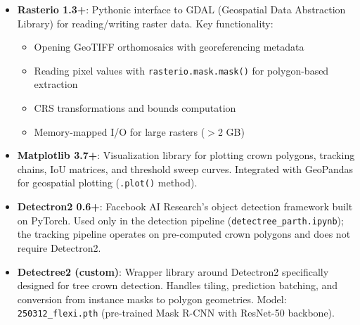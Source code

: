 \begin{itemize}[leftmargin=*, itemsep=2pt]
    \item \textbf{Rasterio 1.3+}: Pythonic interface to GDAL (Geospatial Data Abstraction Library) for reading/writing raster data. Key functionality:
    \begin{itemize}
        \item Opening GeoTIFF orthomosaics with georeferencing metadata
        \item Reading pixel values with \texttt{rasterio.mask.mask()} for polygon-based extraction
        \item CRS transformations and bounds computation
        \item Memory-mapped I/O for large rasters ($>$2 GB)
    \end{itemize}
    
    \item \textbf{Matplotlib 3.7+}: Visualization library for plotting crown polygons, tracking chains, IoU matrices, and threshold sweep curves. Integrated with GeoPandas for geospatial plotting (\texttt{.plot()} method).
    
    \item \textbf{Detectron2 0.6+}: Facebook AI Research's object detection framework built on PyTorch. Used only in the detection pipeline (\texttt{detectree\_parth.ipynb}); the tracking pipeline operates on pre-computed crown polygons and does not require Detectron2.
    
    \item \textbf{Detectree2 (custom)}: Wrapper library around Detectron2 specifically designed for tree crown detection. Handles tiling, prediction batching, and conversion from instance masks to polygon geometries. Model: \texttt{250312\_flexi.pth} (pre-trained Mask R-CNN with ResNet-50 backbone).
\end{itemize}

